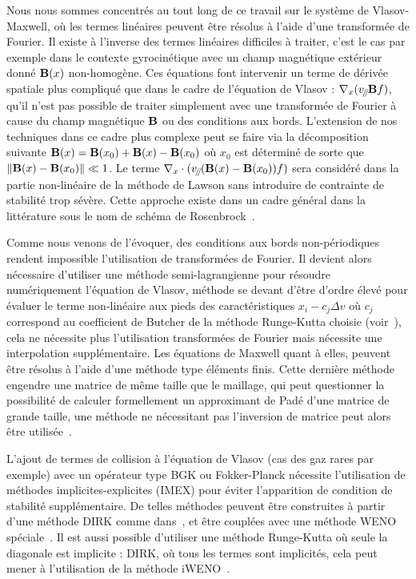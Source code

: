 Nous nous sommes concentrés au tout long de ce travail sur le système de Vlasov-Maxwell, où les termes linéaires peuvent être résolus à l'aide d'une transformée de Fourier. Il existe à l'inverse des termes linéaires difficiles à traiter, c'est le cas par exemple dans le contexte gyrocinétique avec un champ magnétique extérieur donné $\vb{B}(x)$ non-homogène. Ces équations font intervenir un terme de dérivée spatiale plus compliqué que dans le cadre de l'équation de Vlasov : $\nabla_{x}(v_{\mathbin{\!/\mkern-5mu/\!}}\vb{B}f)$, qu'il n'est pas possible de traiter simplement avec une transformée de Fourier à cause du champ magnétique $\vb{B}$ ou des conditions aux bords. L'extension de nos techniques dans ce cadre plus complexe peut se faire via la décomposition suivante $\vb{B}(x)=\vb{B}(x_0)+\vb{B}(x)-\vb{B}(x_0)$ où $x_0$ est déterminé de sorte que $\|\vb{B}(x)-\vb{B}(x_0)\| \ll 1$. Le terme $\nabla_x\cdot (v_{\mathbin{\!/\mkern-5mu/\!}} (\vb{B}(x)-\vb{B}(x_0))f)$ sera considéré dans la partie non-linéaire de la méthode de Lawson sans introduire de contrainte de stabilité trop sévère. Cette approche existe dans un cadre général dans la littérature sous le nom de schéma de Rosenbrock~\cite{Hochbruck:2006,Hochbruck:2009,Luan:2016}.


Comme nous venons de l'évoquer, des conditions aux bords non-périodiques rendent impossible l'utilisation de transformées de Fourier. Il devient alors nécessaire d'utiliser une méthode semi-lagrangienne pour résoudre numériquement l'équation de Vlasov, méthode se devant d'être d'ordre élevé pour évaluer le terme non-linéaire aux pieds des caractéristiques $x_i - c_j\Delta v$ où $c_j$ correspond au coefficient de Butcher de la méthode Runge-Kutta choisie (voir~\cite{Boscarino:2019a}), cela ne nécessite plus l'utilisation transformées de Fourier mais nécessite une interpolation supplémentaire. Les équations de Maxwell quant à elles, peuvent être résolus à l'aide d'une méthode type éléments finis. Cette dernière méthode engendre une matrice de même taille que le maillage, qui peut questionner la possibilité de calculer formellement un approximant de Padé d'une matrice de grande taille, une méthode ne nécessitant pas l'inversion de matrice peut alors être utilisée~\cite{Li:2011}.

L'ajout de termes de collision à l'équation de Vlasov (cas des gaz rares par exemple) avec un opérateur type BGK ou Fokker-Planck nécessite l'utilisation de méthodes implicites-explicites (IMEX) pour éviter l'apparition de condition de stabilité supplémentaire. De telles méthodes peuvent être construites à partir d'une méthode DIRK comme dans~\cite{Cho:2021}, et être couplées avec une méthode WENO spéciale~\cite{Boscarino:2019}. Il est aussi possible d'utiliser une méthode Runge-Kutta où seule la diagonale est implicite : DIRK, où tous les termes sont implicités, cela peut mener à l'utilisation de la méthode iWENO~\cite{Gottlieb:2006}.

